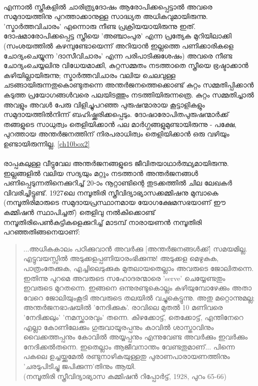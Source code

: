 \paragraph{}എന്നാൽ സ്ത്രീകളിൽ ചാരിത്ര്യദോഷം ആരോപിക്കപ്പെട്ടാൽ അവരെ സമുദായത്തിനു പുറത്താക്കാനുള്ള സാദ്ധ്യത അധികവുമായിരുന്നു. 'സ്മാർത്തവിചാരം' എന്നൊരു നീണ്ട പ്രക്രിയയായിരുന്നു ഇത്. ദോഷമാരോപിക്കപ്പെട്ട സ്ത്രീയെ 'അഞ്ചാംപുര' എന്ന പ്രത്യേക മുറിയിലാക്കി (സംശയത്തിൽ കഴമ്പുണ്ടോയെന്ന് അറിയാൻ ഇല്ലത്തെ പണിക്കാരികളെ ചോദ്യംചെയ്യുന്ന 'ദാസീവിചാരം' എന്ന പരിപാടിക്കുശേഷം) അവരെ നീണ്ട ചോദ്യംചെയ്യലിനു വിധേയമാക്കി, കുറ്റസമ്മതം നടത്താതെ സ്ത്രീയെ ഭ്രഷ്ടാക്കാൻ കഴിയില്ലായിരുന്നു; സ്മാർത്തവിചാരം വലിയ ചെലവുള്ള ചടങ്ങായിരുന്നതുകൊണ്ടുതന്നെ അന്തർജനത്തെക്കൊണ്ട് കുറ്റം സമ്മതിപ്പിക്കാൻ കടുത്ത പ്രയോഗങ്ങൾവരെ പലയിടത്തും നടത്തിയിരുന്നത്രെ. കുറ്റം സമ്മതിച്ചാൽ അവളും അവൾ പേരു വിളിച്ചുപറഞ്ഞ പുരുഷന്മാരായ കൂട്ടാളികളും സമുദായത്തിൽനിന്ന് ബഹിഷ്ക്കരിക്കപ്പെടും. ദോഷാരോപിതപുരുഷന്മാർക്ക് തങ്ങളുടെ സാധുത്വം തെളിയിക്കാൻ പല മാർഗ്ഗങ്ങളുമുണ്ടായിരുന്നു - പക്ഷേ, പുറത്തായ അന്തർജനത്തിന് നിരപരാധിത്വം തെളിയിക്കാൻ ഒരു വഴിയും ഉണ്ടായിരുന്നില്ല. \ref{ch10box2}

\paragraph{}രാപ്പകലുള്ള വീട്ടുവേല അന്തർജനങ്ങളുടെ ജീവിതയാഥാർത്ഥ്യമായിരുന്നു. ഇല്ലങ്ങളിൽ വലിയ സദ്യയും മറ്റും നടത്താൻ അന്തർജനങ്ങൾ പണിപ്പെടുന്നതിനെക്കുറിച്ച് 20-ാം നൂറ്റാണ്ടിന്റെ തുടക്കത്തിൽ ചില ലേഖകർ വിവരിച്ചിട്ടുണ്ട്. 1927ലെ നമ്പൂതിരി സ്ത്രീവിദ്യാഭ്യാസക്കമ്മിഷനു മുമ്പാകെ (നമ്പൂതിരിമാരുടെ സമുദായപ്രസ്ഥാനമായ യോഗക്ഷേമസഭയാണ് ഈ കമ്മിഷൻ സ്ഥാപിച്ചത്) തെളിവു നൽകിക്കൊണ്ട് നമ്പൂതിരിപെൺകുട്ടികളെക്കുറിച്ച് മാടമ്പ് നാരായണൻ നമ്പൂതിരി പറഞ്ഞതിങ്ങനെയാണ്:
\begin{quotation}
...അധികകാലം പഠിക്കുവാൻ അവർക്കു [അന്തർജനങ്ങൾക്ക്] സമയമില്ല. എട്ടുവയസ്സിൽ അടുക്കളപ്പണിയാരംഭിക്കുന്നു! അടുക്കള മെഴുകുക, പാത്രംതേക്കുക, എച്ചിലെടുക്കുക മുതലായതെല്ലാം അവരുടെ ജോലിതന്നെ. ഇതിന്നു പുറമെ അവരുടെ സഹോദരന്മാരെ 'serve' ചെയ്യേണ്ടതും ഇവരുടെ മുറതന്നെ. ഇങ്ങനെ ഒന്നുരണ്ടുകൊല്ലം കഴിയുമ്പോഴേക്കും അതാ വേറെ ജോലിയുംകൂടി അവരുടെ തലയിൽ വച്ചുകെട്ടുന്നു. അതു മറ്റൊന്നുമല്ല; അന്തർജനഭാഷയിൽ 'നേദിക്കുക'. രാവിലെ മുതൽ 10 മണിവരെ 'നേദിക്കലും' 'നമസ്ക്കാരവും' തന്നെ. കിഴക്കോട്ട്, തെക്കോട്ട്, എന്തിനേറെ എല്ലാ കോണിലേക്കും ഗുരുവായൂരപ്പനും കാവിൽ ശാസ്താവിനും വൈക്കത്തപ്പനും കോവിൽ അയ്യപ്പനും എന്നുവേണ്ട അവർക്കും ഇവർക്കും നേദിക്കൽതന്നെ. ഇതെല്ലാം ആജീവനാന്തം വേണ്ടതുമാണ്... പിന്നെ പകലെ ഉച്ചയ്ക്കുമേൽ രണ്ടുനാഴികയുള്ളതു പുരാണപാരായണത്തിനും 'ചരടുപിടിച്ചു ജപിക്കുന്ന'തിനും ആയി.
\\(നമ്പൂതിരി സ്ത്രീവിദ്യാഭ്യാസ കമ്മിഷൻ റിപ്പോർട്ട്, 1928, പുറം 65-66)
\end{quotation}

